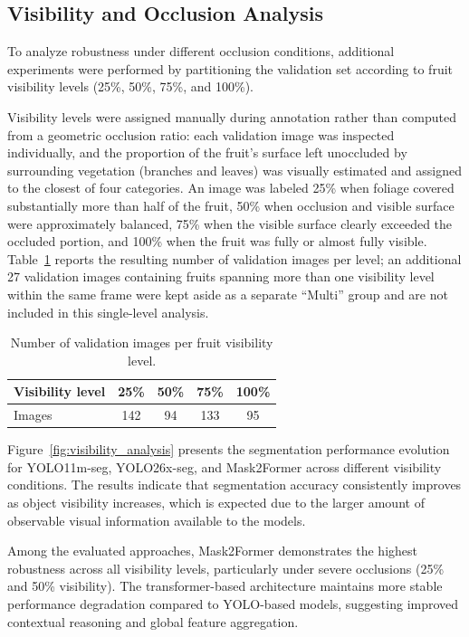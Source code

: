 \documentclass[runningheads]{llncs}
\begin{document}
\subsection{Visibility and Occlusion Analysis}
To analyze robustness under different occlusion conditions, additional experiments were performed by partitioning the validation set according to fruit visibility levels (25\%, 50\%, 75\%, and 100\%).

Visibility levels were assigned manually during annotation rather than
computed from a geometric occlusion ratio: each validation image was
inspected individually, and the proportion of the fruit's surface left
unoccluded by surrounding vegetation (branches and leaves) was visually
estimated and assigned to the closest of four categories. An image was
labeled 25\% when foliage covered substantially more than half of the fruit,
50\% when occlusion and visible surface were approximately balanced, 75\%
when the visible surface clearly exceeded the occluded portion, and 100\%
when the fruit was fully or almost fully visible. Table~\ref{tab:visibility_counts}
reports the resulting number of validation images per level; an additional 27
validation images containing fruits spanning more than one visibility level
within the same frame were kept aside as a separate ``Multi'' group and are
not included in this single-level analysis.

\begin{table}[t]
\centering
\caption{Number of validation images per fruit visibility level.}
\label{tab:visibility_counts}
\setlength{\tabcolsep}{8pt}
\small
\begin{tabular}{lcccc}
\hline
\textbf{Visibility level} & 25\% & 50\% & 75\% & 100\% \\
\hline
Images & 142 & 94 & 133 & 95 \\
\hline
\end{tabular}
\end{table}

Figure~\ref{fig:visibility_analysis} presents the segmentation performance evolution for YOLO11m-seg, YOLO26x-seg, and Mask2Former across different visibility conditions. The results indicate that segmentation accuracy consistently improves as object visibility increases, which is expected due to the larger amount of observable visual information available to the models.

Among the evaluated approaches, Mask2Former demonstrates the highest robustness across all visibility levels, particularly under severe occlusions (25\% and 50\% visibility). The transformer-based architecture maintains more stable performance degradation compared to YOLO-based models, suggesting improved contextual reasoning and global feature aggregation.
\end{document}
